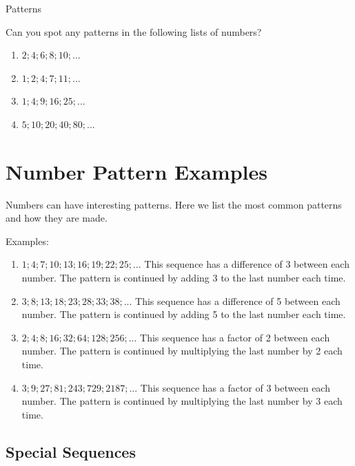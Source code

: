         \begin{exercises}{Patterns }
         {
      \label{m39364*id62189}Can you spot any patterns in the following lists of numbers?\par 
      \label{m39364*id62194}\begin{enumerate}[noitemsep, label=\textbf{\arabic*}. ] 
            \label{m39364*uid1}\item $2;4;6;8;10;...$\label{m39364*uid2}\item $1;2;4;7;11;...$
\label{m39364*uid3}\item $1;4;9;16;25;...$
\label{m39364*uid4}\item $5;10;20;40;80;...$
\end{enumerate}
}
    \label{m39364*cid2}
            \section{Number Pattern Examples}
            \nopagebreak
            \label{m39364*id62635}Numbers can have interesting patterns. Here we list the most common patterns and how they are made.\par 
      \label{m39364*id62640}Examples:\par 
      \label{m39364*id62643}\begin{enumerate}[noitemsep, label=\textbf{\arabic*}. ] 
            \label{m39364*uid5}\item $1;4;7;10;13;16;19;22;25;...$
This sequence has a difference of 3 between each number.
The pattern is continued by adding 3 to the last number each time.
\label{m39364*uid6}\item $3;8;13;18;23;28;33;38;...$
This sequence has a difference of 5 between each number.
The pattern is continued by adding 5 to the last number each time.
\label{m39364*uid7}\item $2;4;8;16;32;64;128;256;...$
This sequence has a factor of 2 between each number.
The pattern is continued by multiplying the last number by 2 each time.
\label{m39364*uid8}\item $3;9;27;81;243;729;2187;...$
This sequence has a factor of 3 between each number.
The pattern is continued by multiplying the last number by 3 each time.
\end{enumerate}
      \label{m39364*uid9}
           \subsection*{ Special Sequences}
            \nopagebreak
            \label{m39364*uid10}

\end{exercises}
